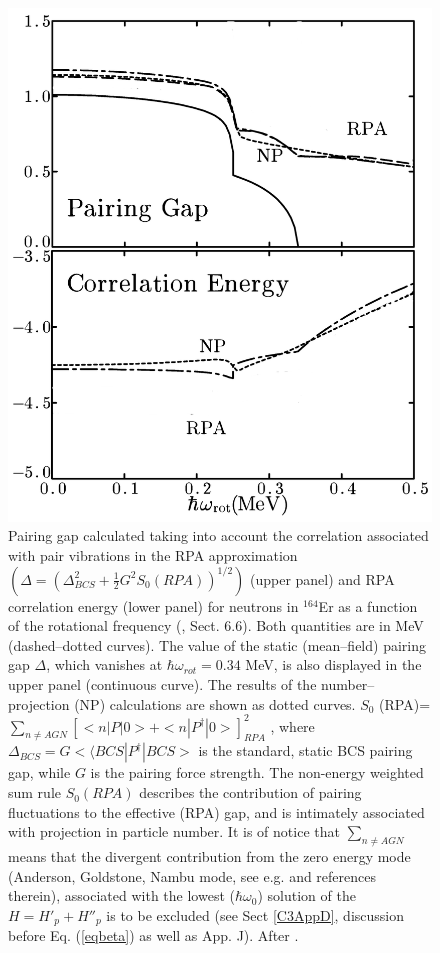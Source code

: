   \begin{figure}
  \centerline{\includegraphics*[width=\textwidth,angle=0]{nutshell/figs/fig1_1_2.pdf}}
  \caption{Pairing gap calculated taking into account the correlation associated with pair vibrations in the RPA approximation $(\Delta=(\Delta^2_{BCS}+\tfrac{1}{2}G^2S_0(RPA))^{1/2})$ (upper panel) and RPA correlation energy (lower panel) for neutrons in $^{164}$Er as a function of the rotational frequency (\cite{Brink:05}, Sect. 6.6). Both quantities are in MeV (dashed--dotted curves). The value of the static (mean--field) pairing gap $\Delta$, which vanishes at $\hbar \omega_{rot}=0.34 $ MeV, is also displayed in the upper panel (continuous curve). The results of the number--projection (NP) calculations are shown as dotted curves.  $S_0$ (RPA)= $\sum_{n \neq AGN} \left[<n|P |0>  + <n|P^{\dagger} |0>\right]^2_{RPA}$ ,
    where \mbox{$\Delta_{BCS} = G<⟨BCS|P^{\dagger}|BCS>$} is the standard, static BCS pairing gap,
    while $G$ is the pairing force strength. The non-energy weighted sum rule $S_0 (RPA)$
    describes the contribution of pairing fluctuations to the effective (RPA) gap,
    and is intimately associated with projection in particle number. It is of notice
    that $\sum_{n \neq AGN}$ means that the divergent contribution from the zero energy mode
    (Anderson, Goldstone, Nambu mode, see e.g. \cite{Broglia:00} and references therein), associated with the lowest ($\hbar \omega_0$) solution
    of the $H = H'_{p} +H''_p$ is to be excluded (see Sect \ref{C3AppD}, discussion before Eq. (\ref{eqbeta}) as well as \cite{Brink:05} App. J). After \cite{Shimizu:90}.}\label{fig1.2}
  \end{figure}
  
